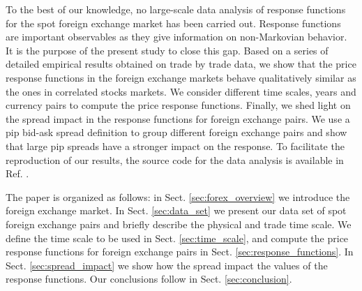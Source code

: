 To the best of our knowledge, no large-scale data analysis of response
functions for the spot foreign exchange market has been carried out. Response
functions are important observables as they give information on non-Markovian
behavior. It is the purpose of the present study to close this gap. Based on a
series of detailed empirical results obtained on trade by trade data, we show
that the price response functions in the foreign exchange markets behave
qualitatively similar as the ones in correlated stocks markets. We consider
different time scales, years and currency pairs to compute the price response
functions. Finally, we shed light on the spread impact in the response
functions for foreign exchange pairs. We use a pip bid-ask spread definition to
group different foreign exchange pairs and show that large pip spreads have a
stronger impact on the response. To facilitate the reproduction of our results,
the source code for the data analysis is available in Ref. \cite{code}.

The paper is organized as follows: in Sect. \ref{sec:forex_overview} we
introduce the foreign exchange market. In Sect. \ref{sec:data_set} we present
our data set of spot foreign exchange pairs and briefly describe the physical
and trade time scale. We define the time scale to be used in Sect.
\ref{sec:time_scale}, and compute the price response functions for foreign
exchange pairs in Sect.  \ref{sec:response_functions}. In Sect.
\ref{sec:spread_impact} we show how the spread impact the values of the
response functions. Our conclusions follow in Sect. \ref{sec:conclusion}.
